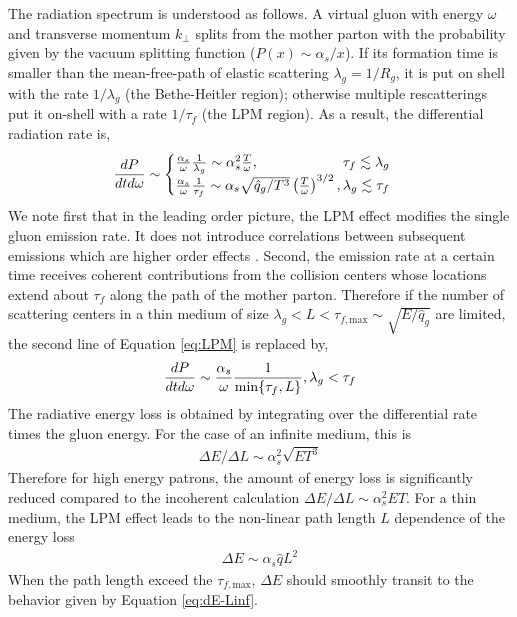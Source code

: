 \documentclass[aps, prc, reprint, amsmath, groupedaddress, nofootinbib]{revtex4-1}
\begin{document}
The radiation spectrum is understood as follows. 
A virtual gluon with energy $\omega$ and transverse momentum $k_\perp$ splits from the mother parton with the probability given by the vacuum splitting function ($P(x) \sim \alpha_s/x$).
If its formation time is smaller than the mean-free-path of elastic scattering $\lambda_g = 1/R_g$, it is put on shell with the rate $1/\lambda_g$ (the Bethe-Heitler region); otherwise multiple rescatterings put it on-shell with a rate $1/\tau_f$ (the LPM region).
As a result, the differential radiation rate is,
\begin{eqnarray}\label{eq:LPM}
\frac{dP}{dt d\omega} \sim \begin{cases}
 \frac{\alpha_s}{\omega} \frac{1}{\lambda_g} \sim \alpha_s^2  \frac{T}{\omega}, \hfill \tau_f \lesssim \lambda_g\\
 \frac{\alpha_s}{\omega} \frac{1}{\tau_f}\sim \alpha_s \sqrt{\hat{q}_g/T^3} \left(\frac{T}{\omega}\right)^{3/2}, \hfill \lambda_g \lesssim \tau_f
\end{cases}
\end{eqnarray}
We note first that in the leading order picture, the LPM effect modifies the single gluon emission rate. 
It does not introduce correlations between subsequent emissions which are higher order effects \cite{Arnold:2016jnq}.
Second, the emission rate at a certain time receives coherent contributions from the collision centers whose locations extend about $\tau_f$ along the path of the mother parton.
Therefore if the number of scattering centers in a thin medium of size $\lambda_g < L< \tau_{f,\textrm{max}} \sim \sqrt{E/\hat{q}_g}$ are limited, the second line of Equation \ref{eq:LPM} is replaced by,
\begin{eqnarray}
\frac{dP}{dt d\omega} \sim 
 \frac{\alpha_s}{\omega} \frac{1}{\min\{\tau_f,L\}}, \hfill \lambda_g < \tau_f
\end{eqnarray}
The radiative energy loss is obtained by integrating over the differential rate times the gluon energy. 
For the case of an infinite medium, this is
\begin{eqnarray}\label{eq:dE-Linf}
\Delta E/\Delta L \sim \alpha_s^2 \sqrt{ET^3}
\end{eqnarray}
Therefore for high energy patrons, the amount of energy loss is significantly reduced compared to the incoherent calculation $\Delta E/\Delta L \sim \alpha_s^2 E T$.
For a thin medium, the LPM effect leads to the non-linear path length $L$ dependence of the energy loss
\begin{eqnarray}\label{eq:dE-Lfinite}
\Delta E \sim \alpha_s \hat{q} L^2
\end{eqnarray}
When the path length exceed the $\tau_{f,\textrm{max}}$, $\Delta E$ should smoothly transit to the behavior given by Equation \ref{eq:dE-Linf}.
\end{document}
